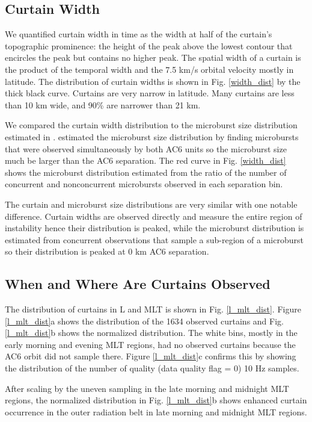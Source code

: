 \documentclass[draft]{agujournal2019}
\begin{document}
\subsection{Curtain Width}
We quantified curtain width in time as the width at half of the curtain's topographic prominence: the height of the peak above the lowest contour that encircles the peak but contains no higher peak. The spatial width of a curtain is the product of the temporal width and the 7.5 km/s orbital velocity mostly in latitude. The distribution of curtain widths is shown in Fig. \ref{width_dist} by the thick black curve. Curtains are very narrow in latitude. Many curtains are less than 10 km wide, and 90\% are narrower than 21 km.
	
We compared the curtain width distribution to the microburst size distribution estimated in .  estimated the microburst size distribution by finding microbursts that were observed simultaneously by both AC6 units so the microburst size much be larger than the AC6 separation. The red curve in Fig. \ref{width_dist} shows the microburst distribution estimated from the ratio of the number of concurrent and nonconcurrent microbursts observed in each separation bin. 

The curtain and microburst size distributions are very similar with one notable difference. Curtain widths are observed directly and measure the entire region of instability hence their distribution is peaked, while the microburst distribution is estimated from concurrent observations that sample a sub-region of a microburst so their distribution is peaked at 0 km AC6 separation.

\subsection{When and Where Are Curtains Observed}
The distribution of curtains in L and MLT is shown in Fig. \ref{l_mlt_dist}. Figure \ref{l_mlt_dist}a shows the distribution of the 1634 observed curtains and Fig. \ref{l_mlt_dist}b shows the normalized distribution. The white bins, mostly in the early morning and evening MLT regions, had no observed curtains because the AC6 orbit did not sample there. Figure \ref{l_mlt_dist}c confirms this by showing the distribution of the number of quality (data quality flag = 0) 10 Hz samples.

After scaling by the uneven sampling in the late morning and midnight MLT regions, the normalized distribution in Fig. \ref{l_mlt_dist}b shows enhanced curtain occurrence in the outer radiation belt in late morning and midnight MLT regions.
\end{document}
